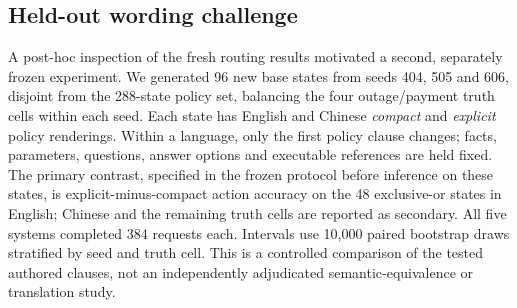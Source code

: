 \subsection{Held-out wording challenge}
A post-hoc inspection of the fresh routing results motivated a second, separately frozen experiment. We generated 96 new base states from seeds 404, 505 and 606, disjoint from the 288-state policy set, balancing the four outage/payment truth cells within each seed. Each state has English and Chinese \emph{compact} and \emph{explicit} policy renderings. Within a language, only the first policy clause changes; facts, parameters, questions, answer options and executable references are held fixed. The primary contrast, specified in the frozen protocol before inference on these states, is explicit-minus-compact action accuracy on the 48 exclusive-or states in English; Chinese and the remaining truth cells are reported as secondary. All five systems completed 384 requests each. Intervals use 10,000 paired bootstrap draws stratified by seed and truth cell. This is a controlled comparison of the tested authored clauses, not an independently adjudicated semantic-equivalence or translation study.
